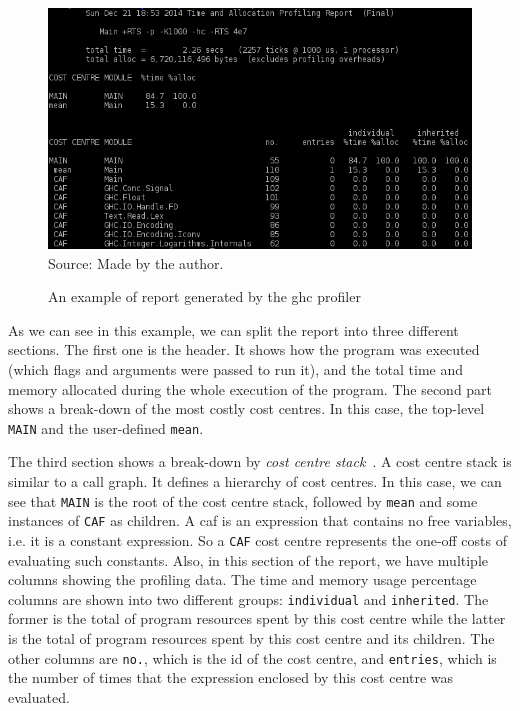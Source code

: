 \begin{figure}[htp]
  \centering
  \caption{An example of report generated by the \ac{ghc} profiler}
  \includegraphics[width=\columnwidth]{images/profiler-placeholder}
  \footnotesize{Source: Made by the author.}
  \label{fig:profiler-sample}
\end{figure}

As we can see in this example, we can split the report into three different sections. The first one is the header. It shows how the program was executed (which flags and arguments were passed to run it), and the total time and memory allocated during the whole execution of the program. The second part shows a break-down of the most costly cost centres. In this case, the top-level \texttt{MAIN} and the user-defined \texttt{mean}.

The third section shows a break-down by \emph{cost centre stack}~\citep{morgan:1998}. A cost centre stack is similar to a call graph. It defines a hierarchy of cost centres. In this case, we can see that \texttt{MAIN} is the root of the cost centre stack, followed by \texttt{mean} and some instances of \texttt{CAF} as children. A \ac{caf} is an expression that contains no free variables, i.e. it is a constant expression. So a \texttt{CAF} cost centre represents the one-off costs of evaluating such constants. Also, in this section of the report, we have multiple columns showing the profiling data. The time and memory usage percentage columns are shown into two different groups: \texttt{individual} and \texttt{inherited}. The former is the total of program resources spent by this cost centre while the latter is the total of program resources spent by this cost centre and its children. The other columns are \texttt{no.}, which is the id of the cost centre, and \texttt{entries}, which is the number of times that the expression enclosed by this cost centre was evaluated.

